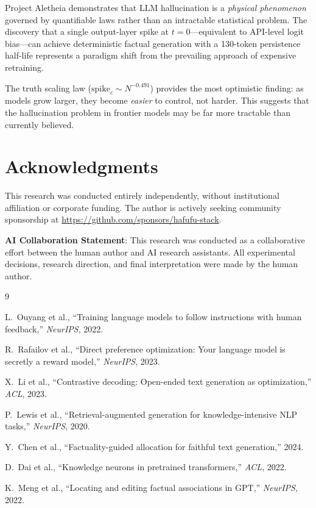 \documentclass[11pt,a4paper]{article}
\begin{document}
Project Aletheia demonstrates that LLM hallucination is a \emph{physical phenomenon} governed by quantifiable laws rather than an intractable statistical problem. The discovery that a single output-layer spike at $t=0$---equivalent to API-level logit bias---can achieve deterministic factual generation with a 130-token persistence half-life represents a paradigm shift from the prevailing approach of expensive retraining.

The truth scaling law ($\text{spike}_c \sim N^{-0.491}$) provides the most optimistic finding: as models grow larger, they become \emph{easier} to control, not harder. This suggests that the hallucination problem in frontier models may be far more tractable than currently believed.

\section*{Acknowledgments}

This research was conducted entirely independently, without institutional affiliation or corporate funding. The author is actively seeking community sponsorship at \url{https://github.com/sponsors/hafufu-stack}.

\vspace{1em}
\noindent \textbf{AI Collaboration Statement}: This research was conducted as a collaborative effort between the human author and AI research assistants. All experimental decisions, research direction, and final interpretation were made by the human author.

\begin{thebibliography}{9}

L.~Ouyang et al., ``Training language models to follow instructions with human feedback,'' \emph{NeurIPS}, 2022.

R.~Rafailov et al., ``Direct preference optimization: Your language model is secretly a reward model,'' \emph{NeurIPS}, 2023.

X.~Li et al., ``Contrastive decoding: Open-ended text generation as optimization,'' \emph{ACL}, 2023.

P.~Lewis et al., ``Retrieval-augmented generation for knowledge-intensive NLP tasks,'' \emph{NeurIPS}, 2020.

Y.~Chen et al., ``Factuality-guided allocation for faithful text generation,'' 2024.

D.~Dai et al., ``Knowledge neurons in pretrained transformers,'' \emph{ACL}, 2022.

K.~Meng et al., ``Locating and editing factual associations in GPT,'' \emph{NeurIPS}, 2022.

\end{thebibliography}
\end{document}
